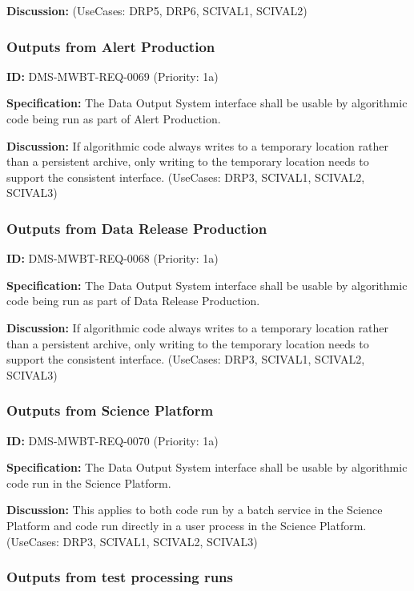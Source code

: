 \documentclass[SE,toc,lsstdraft]{lsstdoc}
\begin{document}
\textbf{Discussion:}
(UseCases: DRP5, DRP6, SCIVAL1, SCIVAL2)

\subsubsection{Outputs from Alert Production}

\label{DMS-MWBT-REQ-0069}
\textbf{ID:} DMS-MWBT-REQ-0069 (Priority: 1a)

\textbf{Specification:}
The Data Output System interface shall be usable by algorithmic code being run as part of Alert Production.

\textbf{Discussion:}
If algorithmic code always writes to a temporary location rather than a persistent archive, only writing to the temporary location needs to support the consistent interface. (UseCases: DRP3, SCIVAL1, SCIVAL2, SCIVAL3)

\subsubsection{Outputs from Data Release Production}

\label{DMS-MWBT-REQ-0068}
\textbf{ID:} DMS-MWBT-REQ-0068 (Priority: 1a)

\textbf{Specification:}
The Data Output System interface shall be usable by algorithmic code being run as part of Data Release Production.

\textbf{Discussion:}
If algorithmic code always writes to a temporary location rather than a persistent archive, only writing to the temporary location needs to support the consistent interface. (UseCases: DRP3, SCIVAL1, SCIVAL2, SCIVAL3)

\subsubsection{Outputs from Science Platform}

\label{DMS-MWBT-REQ-0070}
\textbf{ID:} DMS-MWBT-REQ-0070 (Priority: 1a)

\textbf{Specification:}
The Data Output System interface shall be usable by algorithmic code run in the Science Platform.

\textbf{Discussion:}
This applies to both code run by a batch service in the Science Platform and code run directly in a user process in the Science Platform. (UseCases: DRP3, SCIVAL1, SCIVAL2, SCIVAL3)

\subsubsection{Outputs from test processing runs}
\end{document}

